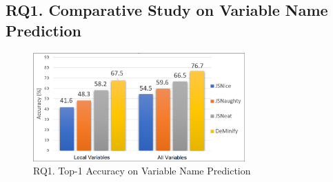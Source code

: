 \subsection{{\bf RQ1. Comparative Study on Variable Name Prediction}}
\label{empirical-rq1}


\begin{figure}[thbp]
\begin{center}
\includegraphics[width=3.2in]{figures/name-prediction-result-2}
\vspace{-8pt}
\caption{RQ1. Top-1 Accuracy on Variable Name Prediction}
\label{name-prediction-result}
\end{center}
\end{figure}


